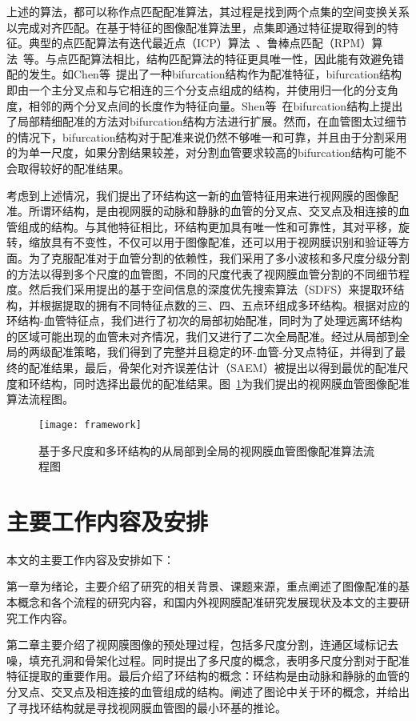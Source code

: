 上述的算法，都可以称作点匹配配准算法，其过程是找到两个点集的空间变换关系以完成对齐匹配。在基于特征的图像配准算法里，点集即通过特征提取得到的特征。典型的点匹配算法有迭代最近点（ICP）算法~\cite{besl}、鲁棒点匹配（RPM）算法~\cite{gold}等。与点匹配算法相比，结构匹配算法的特征更具唯一性，因此能有效避免错配的发生。如Chen等~\cite{chen}\cite{chen15}提出了一种bifurcation结构作为配准特征，bifurcation结构即由一个主分叉点和与它相连的三个分支点组成的结构，并使用归一化的分支角度，相邻的两个分叉点间的长度作为特征向量。Shen等~\cite{shen}\cite{shenben}在bifurcation结构上提出了局部精细配准的方法对bifurcation结构方法进行扩展。然而，在血管图太过细节的情况下，bifurcation结构对于配准来说仍然不够唯一和可靠，并且由于分割采用的为单一尺度，如果分割结果较差，对分割血管要求较高的bifurcation结构可能不会取得较好的配准结果。

考虑到上述情况，我们提出了环结构这一新的血管特征用来进行视网膜的图像配准。所谓环结构，是由视网膜的动脉和静脉的血管的分叉点、交叉点及相连接的血管组成的结构。与其他特征相比，环结构更加具有唯一性和可靠性，其对平移，旋转，缩放具有不变性，不仅可以用于图像配准，还可以用于视网膜识别和验证等方面。为了克服配准对于血管分割的依赖性，我们采用了多小波核和多尺度分级分割的方法以得到多个尺度的血管图，不同的尺度代表了视网膜血管分割的不同细节程度。然后我们采用提出的基于空间信息的深度优先搜索算法（SDFS）来提取环结构，并根据提取的拥有不同特征点数的三、四、五点环组成多环结构。根据对应的环结构-血管特征点，我们进行了初次的局部初始配准，同时为了处理远离环结构的区域可能出现的血管未对齐情况，我们又进行了二次全局配准。经过从局部到全局的两级配准策略，我们得到了完整并且稳定的环-血管-分叉点特征，并得到了最终的配准结果，最后，骨架化对齐误差估计（SAEM）被提出以得到最优的配准尺度和环结构，同时选择出最优的配准结果。图~\ref{framework}为我们提出的视网膜血管图像配准算法流程图。
\begin{figure}[ht!]
\centering
\texttt{[image: framework]}
\caption{基于多尺度和多环结构的从局部到全局的视网膜血管图像配准算法流程图}
\label{framework}
\end{figure}
 
 \section{主要工作内容及安排}
 本文的主要工作内容及安排如下：
 
第一章为绪论，主要介绍了研究的相关背景、课题来源，重点阐述了图像配准的基本概念和各个流程的研究内容，和国内外视网膜配准研究发展现状及本文的主要研究工作内容。
 
第二章主要介绍了视网膜图像的预处理过程，包括多尺度分割，连通区域标记去噪，填充孔洞和骨架化过程。同时提出了多尺度的概念，表明多尺度分割对于配准特征提取的重要作用。最后介绍了环结构的概念：环结构是由动脉和静脉的血管的分叉点、交叉点及相连接的血管组成的结构。阐述了图论中关于环的概念，并给出了寻找环结构就是寻找视网膜血管图的最小环基的推论。
 
